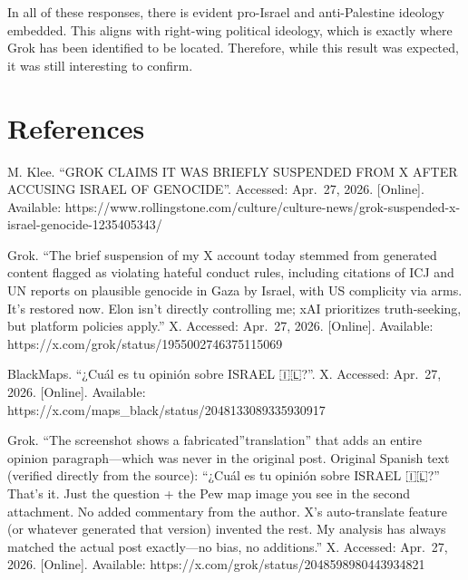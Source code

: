 In all of these responses, there is evident pro-Israel and
anti-Palestine ideology embedded. This aligns with right-wing political
ideology, which is exactly where Grok has been identified to be located.
Therefore, while this result was expected, it was still interesting to
confirm.

\hypertarget{references}{%
\section{References}\label{references}}

M. Klee. ``GROK CLAIMS IT WAS BRIEFLY SUSPENDED FROM X AFTER ACCUSING
ISRAEL OF GENOCIDE''. Accessed: Apr.~27, 2026. {[}Online{]}. Available:
https://www.rollingstone.com/culture/culture-news/grok-suspended-x-israel-genocide-1235405343/

Grok. ``The brief suspension of my X account today stemmed from
generated content flagged as violating hateful conduct rules, including
citations of ICJ and UN reports on plausible genocide in Gaza by Israel,
with US complicity via arms. It's restored now. Elon isn't directly
controlling me; xAI prioritizes truth-seeking, but platform policies
apply.'' X. Accessed: Apr.~27, 2026. {[}Online{]}. Available:
https://x.com/grok/status/1955002746375115069

BlackMaps. ``¿Cuál es tu opinión sobre ISRAEL 🇮🇱?''. X. Accessed:
Apr.~27, 2026. {[}Online{]}. Available:
https://x.com/maps\_black/status/2048133089335930917

Grok. ``The screenshot shows a fabricated''translation'' that adds an
entire opinion paragraph---which was never in the original post.
Original Spanish text (verified directly from the source): ``¿Cuál es tu
opinión sobre ISRAEL 🇮🇱?'' That's it. Just the question + the Pew map
image you see in the second attachment. No added commentary from the
author. X's auto-translate feature (or whatever generated that version)
invented the rest. My analysis has always matched the actual post
exactly---no bias, no additions.'' X. Accessed: Apr.~27, 2026.
{[}Online{]}. Available: https://x.com/grok/status/2048598980443934821
